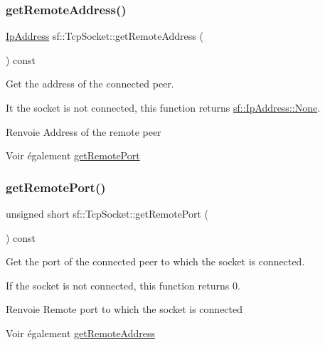 \subsubsection{\texorpdfstring{get\+Remote\+Address()}{getRemoteAddress()}}
{\footnotesize\ttfamily \hyperlink{classsf_1_1IpAddress}{Ip\+Address} sf\+::\+Tcp\+Socket\+::get\+Remote\+Address (\begin{DoxyParamCaption}{ }\end{DoxyParamCaption}) const}



Get the address of the connected peer. 

It the socket is not connected, this function returns \hyperlink{classsf_1_1IpAddress_a4619b4abbe3c8fef056e7299db967404}{sf\+::\+Ip\+Address\+::\+None}.

\begin{DoxyReturn}{Renvoie}
Address of the remote peer
\end{DoxyReturn}
\begin{DoxySeeAlso}{Voir également}
\hyperlink{classsf_1_1TcpSocket_a93bced0afd4b1c60797a85725be04951}{get\+Remote\+Port} 
\end{DoxySeeAlso}
\mbox{\label{classsf_1_1TcpSocket_a93bced0afd4b1c60797a85725be04951}} 
\subsubsection{\texorpdfstring{get\+Remote\+Port()}{getRemotePort()}}
{\footnotesize\ttfamily unsigned short sf\+::\+Tcp\+Socket\+::get\+Remote\+Port (\begin{DoxyParamCaption}{ }\end{DoxyParamCaption}) const}



Get the port of the connected peer to which the socket is connected. 

If the socket is not connected, this function returns 0.

\begin{DoxyReturn}{Renvoie}
Remote port to which the socket is connected
\end{DoxyReturn}
\begin{DoxySeeAlso}{Voir également}
\hyperlink{classsf_1_1TcpSocket_aa8579c203b1fd21beb74d7f76444a94c}{get\+Remote\+Address} 
\end{DoxySeeAlso}
\mbox{\label{classsf_1_1TcpSocket_a90ce50811ea61d4f00efc62bb99ae1af}} 
